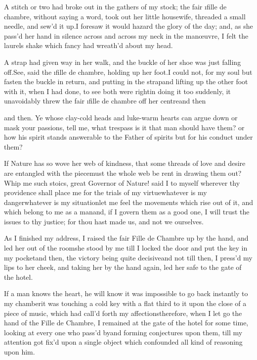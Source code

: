 \documentclass[twoside]{article}
\begin{document}
A stitch or two had broke out in the
gathers of my stock; the fair \i{fille de
chambre}, without saying a word, took out
her little housewife, threaded a small
needle, and sew’d it up.\tskk I foresaw it
would hazard the glory of the day; and, as
she pass’d her hand in silence across and
across my neck in the manœuvre, I felt the
laurels shake which fancy had wreath’d
about my head.

A strap had given way in her walk, and the
buckle of her shoe was just falling
off.\tskk See, said the \i{fille de
chambre}, holding up her foot.\tskk I
could not, for my soul but fasten the
buckle in return, and putting in the
strap\tskk and lifting up the other foot
with it, when I had done, to see both were
right\tskk in doing it too suddenly, it
unavoidably threw the fair \i{fille de
chambre} off her centre\tskk and
then\tskk 





\vskip 6pt


\tskk and then\tskk .  Ye
whose clay-cold heads and luke-warm hearts
can argue down or mask your passions, tell
me, what trespass is it that man should
have them? or how his spirit stands
answerable to the Father of spirits but
for his conduct under them?

If Nature has so wove her web of kindness,
that some threads of love and desire are
entangled with the piece\tskk must the
whole web be rent in drawing them
out?\tskk Whip me such stoics, great
Governor of Nature! said I to myself\tskk
wherever thy providence shall place me for
the trials of my virtue\tskk whatever is
my danger\tskk whatever is my
situation\tskk let me feel the movements
which rise out of it, and which belong to
me as a man\tskk and, if I govern them as
a good one, I will trust the issues to thy
justice; for thou hast made us, and not we
ourselves.

As I finished my address, I raised the
fair Fille de Chambre up by the hand,
and led her out of the room\tskk she
stood by me till I locked the door and put
the key in my pocket\tskk and then,\tskk
the victory being quite decisive\tskk and
not till then, I press’d my lips to her
cheek, and taking her by the hand again,
led her safe to the gate of the hotel.





\vskip 6pt


If a man knows the heart, he will know it
was impossible to go back instantly to my
chamber\tskk it was touching a cold key
with a flat third to it upon the close of
a piece of music, which had call’d forth
my affections\tskk therefore, when I let
go the hand of the Fille de Chambre, I
remained at the gate of the hotel for some
time, looking at every one who pass’d
by\tskk and forming conjectures upon
them, till my attention got fix’d upon a
single object which confounded all kind of
reasoning upon him.
\end{document}
